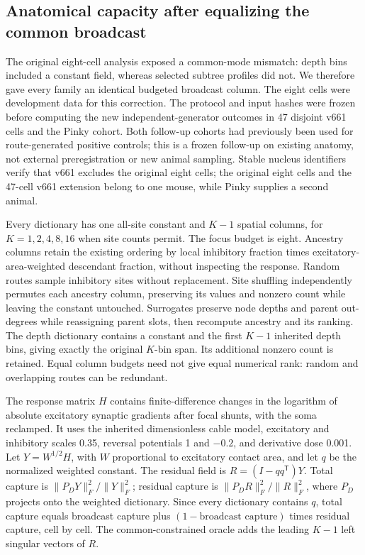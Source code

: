 \subsection{Anatomical capacity after equalizing the common broadcast}

The original eight-cell analysis exposed a common-mode mismatch: depth bins included a constant field, whereas selected subtree profiles did not. We therefore gave every family an identical budgeted broadcast column. The eight cells were development data for this correction. The protocol and input hashes were frozen before computing the new independent-generator outcomes in 47 disjoint v661 cells and the Pinky cohort. Both follow-up cohorts had previously been used for route-generated positive controls; this is a frozen follow-up on existing anatomy, not external preregistration or new animal sampling. Stable nucleus identifiers verify that v661 excludes the original eight cells; the original eight cells and the 47-cell v661 extension belong to one mouse, while Pinky supplies a second animal.

Every dictionary has one all-site constant and $K-1$ spatial columns, for $K=1,2,4,8,16$ when site counts permit. The focus budget is eight. Ancestry columns retain the existing ordering by local inhibitory fraction times excitatory-area-weighted descendant fraction, without inspecting the response. Random routes sample inhibitory sites without replacement. Site shuffling independently permutes each ancestry column, preserving its values and nonzero count while leaving the constant untouched. Surrogates preserve node depths and parent out-degrees while reassigning parent slots, then recompute ancestry and its ranking. The depth dictionary contains a constant and the first $K-1$ inherited depth bins, giving exactly the original $K$-bin span. Its additional nonzero count is retained. Equal column budgets need not give equal numerical rank: random and overlapping routes can be redundant.

The response matrix $H$ contains finite-difference changes in the logarithm of absolute excitatory synaptic gradients after focal shunts, with the soma reclamped. It uses the inherited dimensionless cable model, excitatory and inhibitory scales 0.35, reversal potentials 1 and $-0.2$, and derivative dose 0.001. Let $Y=W^{1/2}H$, with $W$ proportional to excitatory contact area, and let $q$ be the normalized weighted constant. The residual field is $R=(I-qq^{\mathsf T})Y$. Total capture is $\|P_DY\|_F^2/\|Y\|_F^2$; residual capture is $\|P_DR\|_F^2/\|R\|_F^2$, where $P_D$ projects onto the weighted dictionary. Since every dictionary contains $q$, total capture equals broadcast capture plus $(1-\text{broadcast capture})$ times residual capture, cell by cell. The common-constrained oracle adds the leading $K-1$ left singular vectors of $R$.

